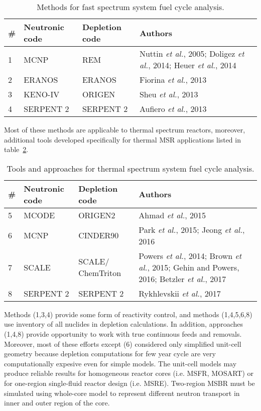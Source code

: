 \begin{table}[h!]
\centering
\caption{Methods for fast spectrum system fuel cycle analysis.}
\begin{tabular}{ |m{}|m{}|m{}|m{}|} 
\hline
\# & Neutronic code  & Depletion code    & Authors         \\[5pt]
\hline
1 & \gls{MCNP}      & REM  & Nuttin \emph{et al.}, 2005; Doligez \emph{et al.}, 2014; Heuer \emph{et al.}, 2014      \\[5pt]
\hline
2 & ERANOS      & ERANOS     & Fiorina \emph{et al.}, 2013 \\[5pt]
\hline
3 & KENO-IV     & ORIGEN     & Sheu \emph{et al.}, 2013 \\[5pt]
\hline
4 & SERPENT 2   & SERPENT 2  & Aufiero \emph{et al.}, 2013 \\[5pt]
\hline
\end{tabular}
  \label{tab:fs_codes}
\end{table}

Most of these methods are applicable to thermal spectrum reactors, moreover, additional tools developed specifically for thermal \gls{MSR} applications listed in table~\ref{tab:th_codes}.

\begin{table}[h!]
\centering
\caption{Tools and approaches for thermal spectrum system fuel cycle analysis.}
\begin{tabular}{ |m{}|m{}|m{}|m{}|} 
\hline
\# & Neutronic code  & Depletion code    & Authors         \\[5pt]
\hline
5 & MCODE      & ORIGEN2      & Ahmad \emph{et al.}, 2015      \\[5pt]
\hline
6 & \gls{MCNP}      & CINDER90     & Park \emph{et al.}, 2015; Jeong \emph{et al.}, 2016 \\[5pt]
\hline
7 & SCALE      & SCALE/ ChemTriton     & Powers \emph{et al.}, 2014; Brown \emph{et al.}, 2015; Gehin and Powers, 2016; Betzler \emph{et al.}, 2017 \\[5pt]
\hline
8 & SERPENT 2      & SERPENT 2     & Rykhlevskii \emph{et al.}, 2017 \\[5pt]
\hline
\end{tabular}
  \label{tab:th_codes}
\end{table}

Methods (1,3,4) provide some form of reactivity control, and methods (1,4,5,6,8) use inventory of all nuclides in depletion calculations. In addition, approaches (1,4,8) provide opportunity to work with true continuous feeds and removals. Moreover, most of these efforts except (6) considered only simplified unit-cell geometry because depletion computations for few year cycle are very computationally expesive even for simple models. The unit-cell models may produce reliable results for homogeneous reactor cores (i.e. \gls{MSFR}, \gls{MOSART}) or for one-region single-fluid reactor design (i.e. \gls{MSRE}). Two-region \gls{MSBR} must be simulated using whole-core model to represent different neutron transport in inner and outer region of the core.

